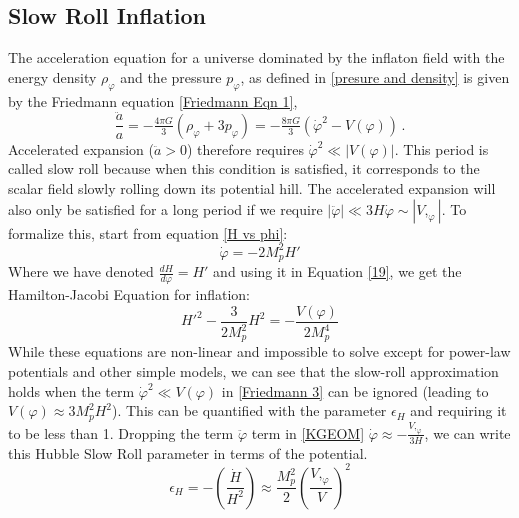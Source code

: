 \documentclass[aps,prd,reprint,preprintnumbers,showpacs,floatfix,nofootinbib,superscript address]{revtex4-2}
\begin{document}
\subsection{Slow Roll Inflation} \label{Slow Roll Inflation}
The acceleration equation for a universe dominated by the inflaton field with the energy density $\rho_{\varphi}$ and the pressure $p_{\varphi}$, as defined in \ref{presure and density} is given by the Friedmann equation \ref{Friedmann Eqn 1},
\[
\frac{\ddot a}{a}
=-\tfrac{4\pi G}{3}(\rho_\varphi+3p_\varphi)
=-\tfrac{8\pi G}{3}(\dot\varphi^2-V(\varphi))\,.
\]
Accelerated expansion ($\ddot{a} > 0$) therefore requires $\dot{\varphi}^2 \ll |V(\varphi)|$. This period is called slow roll because when this condition is satisfied, it corresponds to the scalar field slowly rolling down its potential hill. The accelerated expansion will also only be satisfied for a long period if we require $|\ddot{\varphi}| \ll 3H\dot{\varphi} \sim |V,_{\varphi}|$. To formalize this, start from equation \ref{H vs phi}:
\begin{equation} \label{Hp vs phi}
    \dot{\varphi}  = -  2 M_p^2 H'
\end{equation}
Where we have denoted $\frac{dH}{d\varphi} = H'$ and using it in Equation \ref{19}, we get the Hamilton-Jacobi Equation \cite{copeland1993reconstructing, salopek1990nonlinear} for inflation:
\begin{equation}    \label{Hamilton-Jacobi}
    H'^2 - \frac{3}{2M_p^2}H^2 = - \frac{V(\varphi)}{2M_p^4} 
\end{equation}
While these equations are non-linear and impossible to solve except for power-law potentials and other simple models, we can see that the slow-roll approximation holds when the term $\dot{\varphi}^2 \ll V(\varphi)$ in \ref{Friedmann 3} can be ignored (leading to $V(\varphi) \approx 3M_p^2H^2$). This can be quantified with the parameter $\epsilon_H$ and requiring it to be less than 1. Dropping the term $\ddot{\varphi}$ term in \ref{KGEOM} $\dot{\varphi} \approx -\frac{V,_\varphi}{3H}$, we can write this Hubble Slow Roll parameter in terms of the potential.
\begin{equation}
    \epsilon_H = - \left(\frac{\dot{H}}{H^2} \right) \approx \frac{M_p^2}{2} \left(\frac{V,_\varphi}{V}\right)^2
\end{equation}
\end{document}
